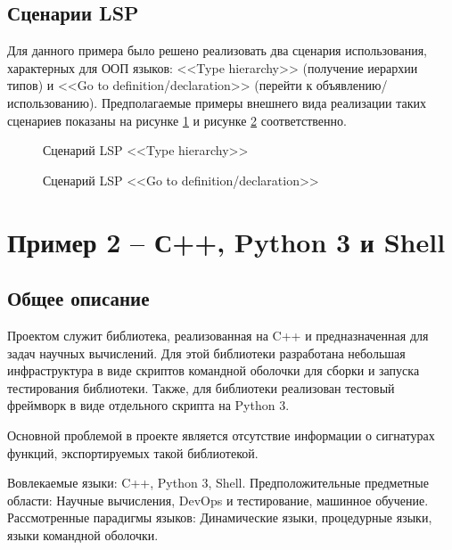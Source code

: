 \subsection{Сценарии LSP}

Для данного примера было решено реализовать два сценария использования, характерных для ООП языков: <<Type hierarchy>> 
(получение иерархии типов) и <<Go to definition/declaration>> (перейти к объявлению/использованию).
Предполагаемые примеры внешнего вида реализации таких сценариев показаны на рисунке \ref{fig:lsp-type-hierarchy} и рисунке \ref{fig:lsp-goto}
соответственно.

\begin{figure}[H]
    \centering
    \caption{Сценарий LSP <<Type hierarchy>>}
    \label{fig:lsp-type-hierarchy}
\end{figure}

\begin{figure}[H]
    \centering
    \caption{Сценарий LSP <<Go to definition/declaration>>}
    \label{fig:lsp-goto}
\end{figure}

\section{Пример 2 -- С++, Python 3 и Shell}

\subsection{Общее описание}

Проектом служит библиотека, реализованная на C++ и предназначенная для задач научных вычислений. Для этой
библиотеки разработана небольшая инфраструктура в виде скриптов командной оболочки для сборки и запуска тестирования библиотеки.
Также, для библиотеки реализован тестовый фреймворк в виде отдельного скрипта на Python 3.

Основной проблемой в проекте является отсутствие информации о сигнатурах функций, экспортируемых такой библиотекой.

Вовлекаемые языки: C++, Python 3, Shell.
Предположительные предметные области: Научные вычисления, DevOps и тестирование, машинное обучение.
Рассмотренные парадигмы языков: Динамические языки, процедурные языки, языки командной оболочки.


